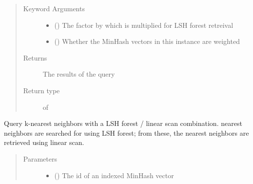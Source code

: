 \documentclass[letterpaper,10pt,english]{sphinxmanual}
\begin{document}
\begin{fulllineitems}
\begin{fulllineitems}
\begin{quote}
\begin{description}
\begin{itemize}
\end{itemize}

\item[{Keyword Arguments}] \leavevmode\begin{itemize}
\item {} 
 () \textendash{} The factor by which  is multiplied for LSH forest retreival

\item {} 
 () \textendash{} Whether the MinHash vectors in this {\hyperref[\detokenize{documentation:tmap.LSHForest}]{}} instance are weighted

\end{itemize}

\item[{Returns}] \leavevmode
The results of the query

\item[{Return type}] \leavevmode
{} of 

\end{description}\end{quote}

\end{fulllineitems}


\begin{fulllineitems}
\label{\detokenize{documentation:tmap.LSHForest.query_linear_scan_by_id}}
Query k-nearest neighbors with a LSH forest / linear scan combination.  nearest neighbors are searched for using LSH forest; from these, the  nearest neighbors are retrieved using linear scan.
\begin{quote}\begin{description}
\item[{Parameters}] \leavevmode\begin{itemize}
\item {} 
 () \textendash{} The id of an indexed MinHash vector


\end{itemize}
\end{description}
\end{quote}
\end{fulllineitems}
\end{fulllineitems}
\end{document}

